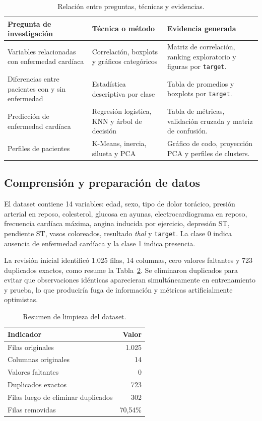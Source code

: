 \documentclass[10pt,a4paper]{article}
\begin{document}
\begin{table}[H]
\centering
\small
\begin{tabularx}{\textwidth}{p{4.2cm}p{4.2cm}X}
\toprule
Pregunta de investigación & Técnica o método & Evidencia generada \\
\midrule
Variables relacionadas con enfermedad cardíaca & Correlación, boxplots y gráficos categóricos & Matriz de correlación, ranking exploratorio y figuras por \texttt{target}. \\
Diferencias entre pacientes con y sin enfermedad & Estadística descriptiva por clase & Tabla de promedios y boxplots por \texttt{target}. \\
Predicción de enfermedad cardíaca & Regresión logística, KNN y árbol de decisión & Tabla de métricas, validación cruzada y matriz de confusión. \\
Perfiles de pacientes & K-Means, inercia, silueta y PCA & Gráfico de codo, proyección PCA y perfiles de clusters. \\
\bottomrule
\end{tabularx}
\caption{Relación entre preguntas, técnicas y evidencias.}
\label{tab:preguntas}
\end{table}

\subsection{Comprensión y preparación de datos}

El dataset contiene 14 variables: edad, sexo, tipo de dolor torácico, presión arterial en reposo, colesterol, glucosa en ayunas, electrocardiograma en reposo, frecuencia cardíaca máxima, angina inducida por ejercicio, depresión ST, pendiente ST, vasos coloreados, resultado \textit{thal} y \texttt{target}. La clase 0 indica ausencia de enfermedad cardíaca y la clase 1 indica presencia.

La revisión inicial identificó 1.025 filas, 14 columnas, cero valores faltantes y 723 duplicados exactos, como resume la Tabla~\ref{tab:limpieza}. Se eliminaron duplicados para evitar que observaciones idénticas aparecieran simultáneamente en entrenamiento y prueba, lo que produciría fuga de información y métricas artificialmente optimistas.

\begin{table}[H]
\centering
\begin{tabular}{lr}
\toprule
Indicador & Valor \\
\midrule
Filas originales & 1.025 \\
Columnas originales & 14 \\
Valores faltantes & 0 \\
Duplicados exactos & 723 \\
Filas luego de eliminar duplicados & 302 \\
Filas removidas & 70,54\% \\
\bottomrule
\end{tabular}
\caption{Resumen de limpieza del dataset.}
\label{tab:limpieza}
\end{table}
\end{document}
